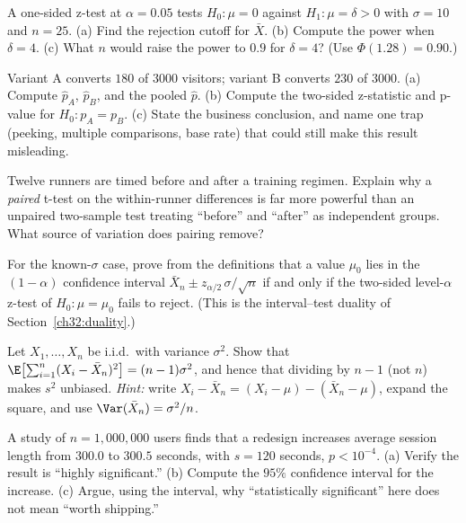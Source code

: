 \begin{exercise}[Power]
A one-sided z-test at $\alpha=0.05$ tests $H_0\!:\mu=0$ against $H_1\!:\mu=\delta>0$ with
$\sigma=10$ and $n=25$. (a) Find the rejection cutoff for $\bar X$. (b) Compute the power
when $\delta=4$. (c) What $n$ would raise the power to $0.9$ for $\delta=4$? (Use
$\Phi(1.28)=0.90$.)
\end{exercise}

\begin{exercise}
Variant A converts $180$ of $3000$ visitors; variant B converts $230$ of $3000$. (a)
Compute $\hat p_A$, $\hat p_B$, and the pooled $\hat p$. (b) Compute the two-sided
z-statistic and p-value for $H_0\!: p_A=p_B$. (c) State the business conclusion, and
name one trap (peeking, multiple comparisons, base rate) that could still make this
result misleading.
\end{exercise}

\begin{exercise}
Twelve runners are timed before and after a training regimen. Explain why a
\emph{paired} t-test on the within-runner differences is far more powerful than an
unpaired two-sample test treating ``before'' and ``after'' as independent groups. What
source of variation does pairing remove?
\end{exercise}

\begin{exercise}
For the known-$\sigma$ case, prove from the definitions that a value $\mu_0$ lies in the
$(1-\alpha)$ confidence interval $\bar X_n \pm z_{\alpha/2}\,\sigma/\sqrt n$ if and only
if the two-sided level-$\alpha$ z-test of $H_0\!:\mu=\mu_0$ fails to reject. (This is the
interval--test duality of Section~\ref{ch32:duality}.)
\end{exercise}

\begin{exercise}
Let $X_1,\dots,X_n$ be i.i.d.\ with variance $\sigma^2$. Show that
$\E\!\left[\sum_{i=1}^n (X_i - \bar X_n)^2\right] = (n-1)\sigma^2$, and hence that
dividing by $n-1$ (not $n$) makes $s^2$ unbiased. \emph{Hint:} write $X_i - \bar X_n =
(X_i - \mu) - (\bar X_n - \mu)$, expand the square, and use $\Var(\bar X_n)=\sigma^2/n$.
\end{exercise}

\begin{exercise}
A study of $n=1{,}000{,}000$ users finds that a redesign increases average session length
from $300.0$ to $300.5$ seconds, with $s=120$ seconds, $p < 10^{-4}$. (a) Verify the
result is ``highly significant.'' (b) Compute the $95\%$ confidence interval for the
increase. (c) Argue, using the interval, why ``statistically significant'' here does not
mean ``worth shipping.''
\end{exercise}
